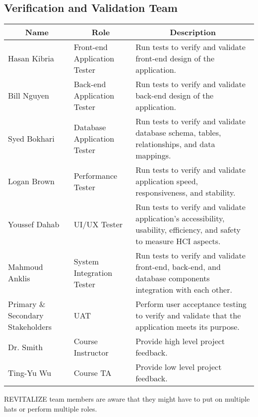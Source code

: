 \documentclass[12pt, titlepage]{article}
\begin{document}
\subsection{Verification and Validation Team}


\begin{table}[H]
	\centering
	\begin{tabular}{|p{3cm}|p{4cm}|p{7cm}|}
		\hline
		\multicolumn{1}{|c|}{\textbf{Name}} & \multicolumn{1}{|c|}{\textbf{Role}} & \multicolumn{1}{|c|}{\textbf{Description}}
		\\ \hline
		Hasan Kibria & Front-end Application Tester & Run tests to verify and validate front-end design of the application.
		\\ \hline
		Bill Nguyen & Back-end Application Tester & Run tests to verify and validate back-end design of the application.
		\\ \hline
		Syed Bokhari & Database Application Tester & Run tests to verify and validate database schema, tables, relationships, and data mappings. 
		\\ \hline
		Logan Brown & Performance Tester & Run tests to verify and validate application speed, responsiveness, and stability.
		\\ \hline
		Youssef Dahab & UI/UX Tester & Run tests to verify and validate application's accessibility, usability, efficiency, and safety to measure HCI aspects.
		\\ \hline  
		Mahmoud Anklis & System Integration Tester & Run tests to verify and validate front-end, back-end, and database components integration with each other.
		\\ \hline
		Primary \& Secondary Stakeholders & UAT & Perform user acceptance testing to verify and validate that the application meets its purpose.
		\\ \hline
		Dr. Smith & Course Instructor & Provide high level project feedback.
		\\ \hline
		Ting-Yu Wu & Course TA & Provide low level project feedback.
		\\ \hline
	\end{tabular}
\end{table}

REVITALIZE team members are aware that they might have to put on multiple hats or perform multiple roles.
\end{document}
